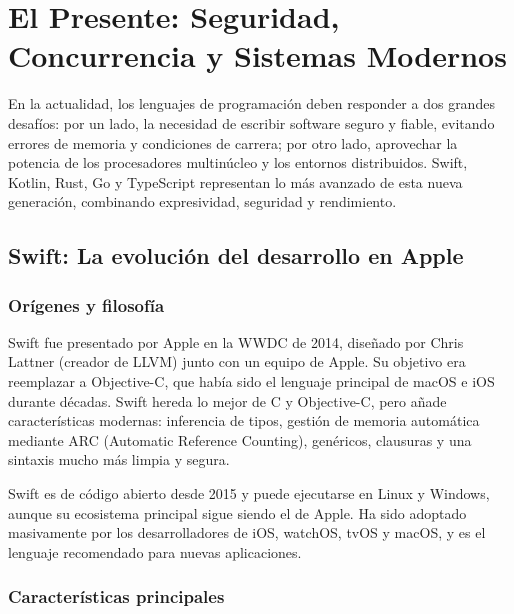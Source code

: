 \chapter{El Presente: Seguridad, Concurrencia y Sistemas Modernos}

En la actualidad, los lenguajes de programación deben responder a dos grandes desafíos: por un lado, la necesidad de escribir software seguro y fiable, evitando errores de memoria y condiciones de carrera; por otro lado, aprovechar la potencia de los procesadores multinúcleo y los entornos distribuidos. Swift, Kotlin, Rust, Go y TypeScript representan lo más avanzado de esta nueva generación, combinando expresividad, seguridad y rendimiento.

\section{Swift: La evolución del desarrollo en Apple}

\subsection{Orígenes y filosofía}

Swift fue presentado por Apple en la WWDC de 2014, diseñado por Chris Lattner (creador de LLVM) junto con un equipo de Apple. Su objetivo era reemplazar a Objective-C, que había sido el lenguaje principal de macOS e iOS durante décadas. Swift hereda lo mejor de C y Objective-C, pero añade características modernas: inferencia de tipos, gestión de memoria automática mediante ARC (Automatic Reference Counting), genéricos, clausuras y una sintaxis mucho más limpia y segura.

Swift es de código abierto desde 2015 y puede ejecutarse en Linux y Windows, aunque su ecosistema principal sigue siendo el de Apple. Ha sido adoptado masivamente por los desarrolladores de iOS, watchOS, tvOS y macOS, y es el lenguaje recomendado para nuevas aplicaciones.

\subsection{Características principales}

